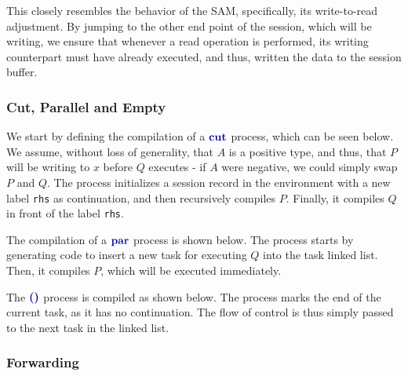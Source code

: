 This closely resembles the behavior of the SAM, specifically, its write-to-read adjustment. By jumping to the other end point of the session, which will be writing, we ensure that whenever a read operation is performed, its writing counterpart must have already executed, and thus, written the data to the session buffer.

\subsubsection{Cut, Parallel and Empty}

We start by defining the compilation of a $\cutp$ process, which can be seen below. We assume, without loss of generality, that $A$ is a positive type, and thus, that $P$ will be writing to $x$ before $Q$ executes - if $A$ were negative, we could simply swap $P$ and $Q$. The process initializes a session record in the environment with a new label \texttt{rhs} as continuation, and then recursively compiles $P$. Finally, it compiles $Q$ in front of the label \texttt{rhs}.

\begin{compilation}{}{\varepsilon}
\end{compilation}

The compilation of a $\parp$ process is shown below. The process starts by generating code to insert a new task for executing $Q$ into the task linked list. Then, it compiles $P$, which will be executed immediately.

\begin{compilation}{}{\varepsilon}
\end{compilation}

The $\emptyp$ process is compiled as shown below. The process marks the end of the current task, as it has no continuation. The flow of control is thus simply passed to the next task in the linked list.

\begin{compilation}{\emptyc}{\varepsilon}
    \nexttask
\end{compilation}

\subsubsection{Forwarding}

